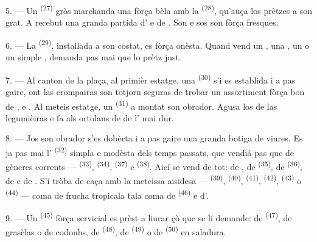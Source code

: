 5. --- Un  \textsuperscript{(27)} gròs marchanda una
 fòrça bèla amb la  \textsuperscript{(28)},
qu'auça los prètzes a son grat. A recebut una granda partida d' e de . Son  e sos 
son fòrça fresques.

\VUsaut{4.0mm}
\VUsaut{3.0mm}

6. --- La  \textsuperscript{(29)}, installada a son costat, es
fòrça onèsta. Quand vend un , una , un  o
un simple , demanda pas mai que lo prètz just.

7. --- Al canton de la plaça, al primièr estatge, una 
\textsuperscript{(30)} s'i es establida i a pas gaire, ont las crompairas son
totjorn seguras de trobar un assortiment fòrça bon de ,
 e . Al meteis estatge, un
 \textsuperscript{(31)} a montat son obrador. Agusa los
 de las legumièiras e fa als ortolans de  de
l' mai dur.

\VUsaut{4.0mm}
\VUsaut{3.0mm}

8. --- Jos son obrador s'es dobèrta i a pas gaire una granda botiga de viures. Es
ja pas mai l' \textsuperscript{(32)} simpla e modèsta dels temps
passats, que vendiá pas que de gèneres corrents --- 
\textsuperscript{(33)},  \textsuperscript{(34)},  \textsuperscript{(37)} e  \textsuperscript{(38)}. Aicí se
vend de tot: de , de 
\textsuperscript{(35)}, de  \textsuperscript{(36)}, de
 e de . S'i tròba de caça amb la
meteissa aisidesa ---  \textsuperscript{(39)}, 
\textsuperscript{(40)},  \textsuperscript{(41)},
 \textsuperscript{(42)}, 
\textsuperscript{(43)} o  \textsuperscript{(44)} --- coma de
frucha tropicala tala coma de  \textsuperscript{(46)} e
d'.

9. --- Un  \textsuperscript{(45)} fòrça servicial es prèst a liurar
çò que se li demande: de  \textsuperscript{(47)}, de grasèlas o
de codonhs, de  \textsuperscript{(48)}, de 
\textsuperscript{(49)} o de  \textsuperscript{(50)} en saladura.

